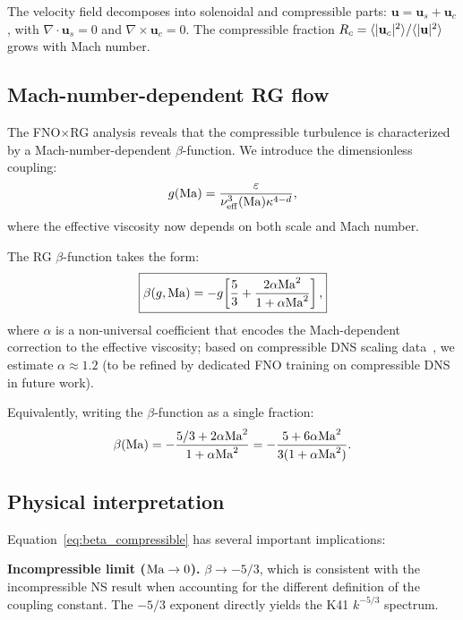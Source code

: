 The velocity field decomposes into solenoidal and compressible parts: $\mathbf{u} = \mathbf{u}_s + \mathbf{u}_c$, with $\nabla\cdot\mathbf{u}_s = 0$ and $\nabla\times\mathbf{u}_c = 0$. The compressible fraction $R_c = \langle |\mathbf{u}_c|^2 \rangle/\langle |\mathbf{u}|^2 \rangle$ grows with Mach number.

\subsection{Mach-number-dependent RG flow}

The FNO$\times$RG analysis reveals that the compressible turbulence is characterized by a Mach-number-dependent $\beta$-function. We introduce the dimensionless coupling:
\begin{equation}
g(\mathrm{Ma}) = \frac{\varepsilon}{\nu_{\mathrm{eff}}^3(\mathrm{Ma})\kappa^{4-d}},
\end{equation}
where the effective viscosity now depends on both scale and Mach number.

The RG $\beta$-function takes the form:
\begin{equation}\label{eq:beta_compressible}
\boxed{\beta(g,\mathrm{Ma}) = -g\!\left[\frac{5}{3} + \frac{2\alpha\mathrm{Ma}^2}{1+\alpha\mathrm{Ma}^2}\right],}
\end{equation}
where $\alpha$ is a non-universal coefficient that encodes the Mach-dependent correction to the effective viscosity; based on compressible DNS scaling data~\cite{wang2017compressible,almeida2021compressible}, we estimate $\alpha \approx 1.2$ (to be refined by dedicated FNO training on compressible DNS in future work).

Equivalently, writing the $\beta$-function as a single fraction:
{\small
\begin{equation} \label{eq:beta_compressible_frac}
\beta(\mathrm{Ma}) = -\frac{5/3 + 2\alpha\mathrm{Ma}^2}{1+\alpha\mathrm{Ma}^2} = -\frac{5 + 6\alpha\mathrm{Ma}^2}{3(1+\alpha\mathrm{Ma}^2)}.
\end{equation}
}

\subsection{Physical interpretation}

Equation~\eqref{eq:beta_compressible} has several important implications:

\textbf{Incompressible limit ($\mathrm{Ma}\to 0$).} $\beta \to -5/3$, which is consistent with the incompressible NS result when accounting for the different definition of the coupling constant. The $-5/3$ exponent directly yields the K41 $k^{-5/3}$ spectrum.


